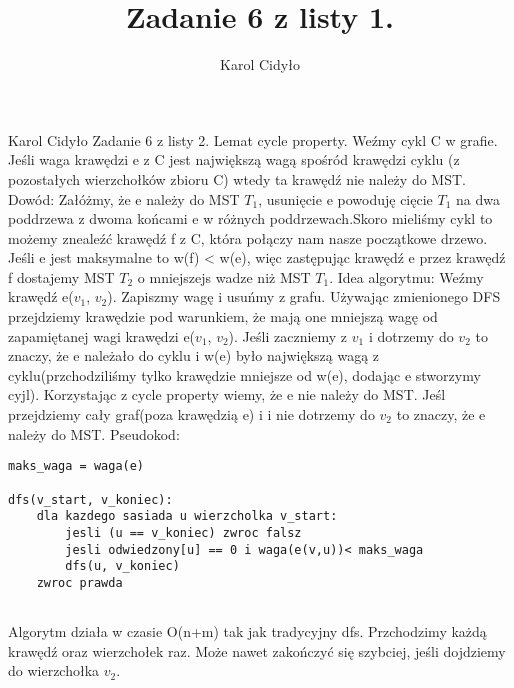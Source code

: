 \documentclass[a4paper,10pt]{article}
\author{Karol Cidyło}
\title {Zadanie 6 z listy 1.}
\begin{document}
Karol Cidyło \newline \newline \newline
Zadanie 6 z listy 2. \newline \newline
Lemat cycle property. \newline
Weźmy cykl C w grafie. Jeśli waga krawędzi e z C jest największą wagą spośród krawędzi cyklu (z pozostałych wierzchołków zbioru C) wtedy ta krawędź nie należy do MST. \newline \newline
Dowód: \newline
Załóżmy, że e należy do MST $T_1$, usunięcie e powoduję cięcie $T_1$ na dwa poddrzewa z dwoma końcami e w różnych poddrzewach.\newline Skoro mieliśmy cykl to możemy znealeźć krawędź f z C, która połączy nam nasze początkowe drzewo. Jeśli e jest maksymalne to w(f) < w(e), więc zastępując krawędź e przez krawędź f dostajemy MST $T_2$ o mniejszejs wadze niż MST $T_1$.  \newline \newline
Idea algorytmu:
Weźmy krawędź e($v_1$, $v_2$). Zapiszmy wagę i usuńmy z grafu. \newline
Używając zmienionego DFS przejdziemy krawędzie pod warunkiem, że mają one mniejszą wagę od zapamiętanej wagi krawędzi e($v_1$, $v_2$). Jeśli zaczniemy z $v_1$ i dotrzemy do $v_2$ to znaczy, że e należało do cyklu i w(e) było największą wagą z cyklu(przchodziliśmy tylko krawędzie mniejsze od w(e), dodając e stworzymy cyjl). Korzystając z cycle property wiemy, że e nie należy do MST. Jeśl przejdziemy cały graf(poza krawędzią e) i i nie dotrzemy do $v_2$ to znaczy, że e należy do MST. \newline \newline
Pseudokod: \newline
\begin{lstlisting}
maks_waga = waga(e)

dfs(v_start, v_koniec):
    dla kazdego sasiada u wierzcholka v_start:
        jesli (u == v_koniec) zwroc falsz
        jesli odwiedzony[u] == 0 i waga(e(v,u))< maks_waga
        dfs(u, v_koniec)
    zwroc prawda
    

\end{lstlisting}
Algorytm działa w czasie O(n+m) tak jak tradycyjny dfs. Przchodzimy każdą krawędź  oraz wierzchołek raz.  \newline 
Może nawet zakończyć się szybciej, jeśli dojdziemy do wierzchołka $v_2$. \newline\newline
\end{document}
